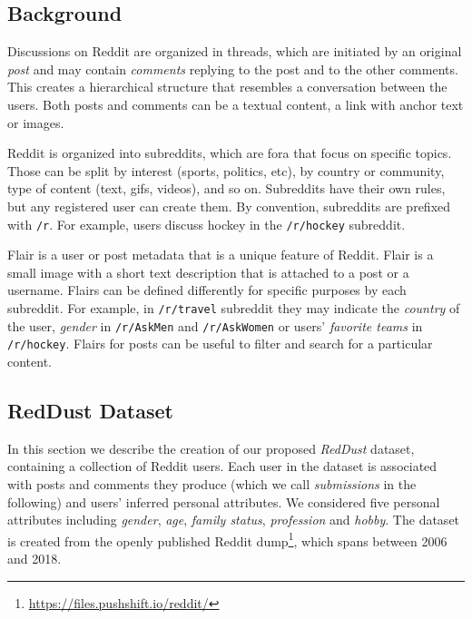 \subsection{Background}


Discussions on Reddit are organized in threads, which are initiated by an original \textit{post} and may contain \textit{comments} replying to the post and to the other comments. This creates a hierarchical structure that resembles a conversation between the users.
Both posts and comments can be a textual content, a link with anchor text or images.

Reddit is organized into subreddits, which are fora that focus on specific topics.
Those can be split by interest (sports, politics, etc), by country or community, type of content (text, gifs, videos), and so on. Subreddits have their own rules, but any registered user can create them. By convention, subreddits are prefixed with \texttt{\small /r}. For example, users discuss hockey in the \texttt{\small /r/hockey} subreddit.

Flair is a user or post metadata that is a unique feature of Reddit. Flair is a small image with a short text description that is attached to a post or a username. Flairs can be defined differently for specific purposes by each subreddit. For example, in \texttt{\small /r/travel} subreddit they may indicate the \textit{country} of the user, \textit{gender} in \texttt{\small /r/AskMen} and \texttt{\small /r/AskWomen} or users' \textit{favorite teams} in \texttt{\small /r/hockey}.
Flairs for posts can be useful to filter and search for a particular content.

\subsection{RedDust Dataset}

In this section we describe the creation of our proposed \emph{RedDust} dataset, containing a collection of Reddit users. Each user in the dataset is associated with posts and comments they produce (which we call \textit{submissions} in the following) and users' inferred personal attributes.
We considered five personal attributes including \textit{gender}, \textit{age}, \textit{family status}, \textit{profession} and \textit{hobby}.
The dataset is created from the openly published Reddit dump\footnote{{\scriptsize \url{https://files.pushshift.io/reddit/}}}, which spans between 2006 and 2018. 

